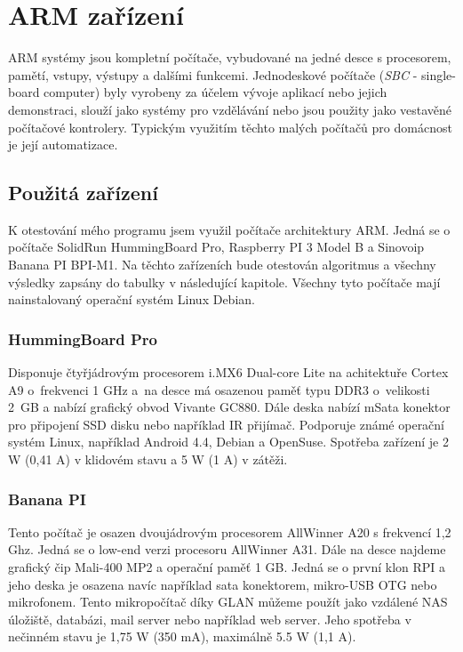 \section{ARM zařízení}
ARM systémy jsou kompletní počítače, vybudované na jedné desce s procesorem, pamětí, vstupy, výstupy a dalšími funkcemi. Jednodeskové počítače (\textit{SBC} - single-board computer) byly vyrobeny za účelem vývoje aplikací nebo jejich demonstraci, slouží jako systémy pro vzdělávání nebo jsou použity jako vestavěné počítačové kontrolery. Typickým využitím těchto malých počítačů pro domácnost je její automatizace. 
\subsection{Použitá zařízení}
K otestování mého programu jsem využil počítače architektury ARM. Jedná se o počítače SolidRun HummingBoard Pro, Raspberry PI 3 Model B a Sinovoip Banana PI BPI-M1. Na těchto zařízeních bude otestován algoritmus a všechny výsledky zapsány do tabulky v následující kapitole. Všechny tyto počítače mají nainstalovaný operační systém Linux Debian.

\subsubsection*{HummingBoard Pro}
 Disponuje čtyřjádrovým procesorem i.MX6 Dual-core Lite na achitektuře Cortex A9 o~frekvenci 1 GHz a~na desce má osazenou paměť typu DDR3 o~velikosti 2~GB a nabízí grafický obvod Vivante GC880. Dále deska nabízí mSata konektor pro připojení SSD disku nebo například IR přijímač. Podporuje známé operační systém Linux, například Android 4.4, Debian a OpenSuse. Spotřeba zařízení je 2 W (0,41 A) v klidovém stavu a 5 W (1 A) v zátěži.

\subsubsection*{Banana PI}
Tento počítač je osazen dvoujádrovým procesorem AllWinner A20 s frekvencí 1,2 Ghz. Jedná se o low-end verzi procesoru AllWinner A31. Dále na desce najdeme grafický čip Mali-400 MP2 a operační paměť 1 GB. Jedná se o první klon RPI a jeho deska je osazena navíc například sata konektorem, mikro-USB OTG nebo mikrofonem. Tento mikropočítač díky GLAN můžeme použít jako vzdálené NAS úložiště, databázi, mail server nebo například web server. Jeho spotřeba v nečinném stavu je 1,75 W (350 mA), maximálně 5.5 W (1,1 A).

